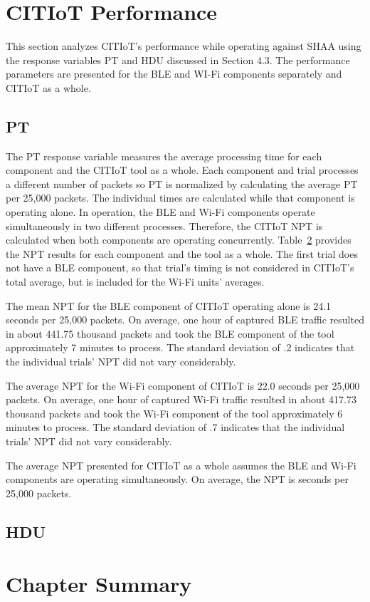 \documentclass[12pt,letterpaper,oneside]{book}
\begin{document}
	\section{CITIoT Performance} \label{citiotPerformance}
	
	This section analyzes \ac{CITIoT}'s performance while operating against \ac{SHAA} using the response variables \ac{PT} and \ac{HDU} discussed in Section 4.3. The performance parameters are presented for the \ac{BLE} and WI-Fi components separately and \ac{CITIoT} as a whole.
	
	\subsection{\ac{PT}}
	The \ac{PT} response variable measures the average processing time for each component and the \ac{CITIoT} tool as a whole. Each component and trial processes a different number of packets so \ac{PT} is normalized by calculating the average \ac{PT} per 25,000 packets. The individual times are calculated while that component is operating alone. In operation, the \ac{BLE} and Wi-Fi components operate simultaneously in two different processes. Therefore, the \ac{CITIoT} \ac{NPT} is calculated when both components are operating concurrently. Table~\ref{} provides the \ac{NPT} results for each component and the tool as a whole. The first trial does not have a \ac{BLE} component, so that trial's timing is not considered in \ac{CITIoT}'s total average, but is included for the Wi-Fi units' averages. 
	
	The mean \ac{NPT} for the \ac{BLE} component of \ac{CITIoT} operating alone is 24.1 seconds per 25,000 packets. On average, one hour of captured \ac{BLE} traffic resulted in about 441.75 thousand packets and took the \ac{BLE} component of the tool approximately 7 minutes to process. The standard deviation of .2 indicates that the individual trials' \ac{NPT} did not vary considerably.
	
	The average \ac{NPT} for the Wi-Fi component of \ac{CITIoT} is 22.0 seconds per 25,000 packets. On average, one hour of captured Wi-Fi traffic resulted in about 417.73 thousand packets and took the Wi-Fi component of the tool approximately 6 minutes to process. The standard deviation of .7 indicates that the individual trials' \ac{NPT} did not vary considerably.
	
	The average \ac{NPT} presented for \ac{CITIoT} as a whole assumes the \ac{BLE} and Wi-Fi components are operating simultaneously. On average, the \ac{NPT} is  seconds per 25,000 packets.
	
	\subsection{\ac{HDU}}
	
	
	\section{Chapter Summary}
	
	
	\todos
	\backmatter
	\singlespace
	
	 
	\clearpage
	
\end{document}
